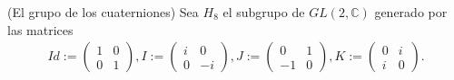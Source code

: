 \question 
(El grupo de los cuaterniones) Sea $H_8$ el subgrupo de $GL(2,\mathbb{C})$ 
generado por las matrices 
\begin{align*}
Id:=
 \begin{pmatrix}
  1 & 0 \\
  0 & 1
 \end{pmatrix},
I:=
 \begin{pmatrix}
  i & 0 \\
  0 & -i
 \end{pmatrix},
J:=
 \begin{pmatrix}
  0 & 1 \\
  -1 & 0
 \end{pmatrix},
K:=
 \begin{pmatrix}
  0 & i \\
  i & 0
 \end{pmatrix}.
\end{align*}
